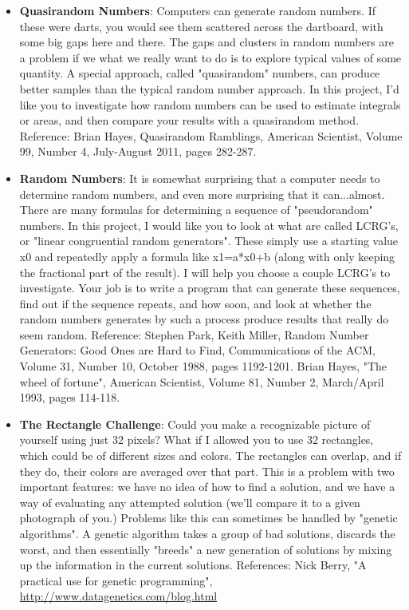 \documentclass{article}
\begin{document}
\begin{itemize}
\item \textbf{Quasirandom Numbers}: Computers can generate random numbers. If these were darts, you would see them scattered across the dartboard, with some big gaps here and there. The gaps and clusters in random numbers are a problem if we what we really want to do is to explore typical values of some quantity. A special approach, called "quasirandom" numbers, can produce better samples than the typical random number approach. In this project, I'd like you to investigate how random numbers can be used to estimate integrals or areas, and then compare your results with a quasirandom method. Reference: Brian Hayes, Quasirandom Ramblings, American Scientist, Volume 99, Number 4, July-August 2011, pages 282-287.

\item \textbf{Random Numbers}: It is somewhat surprising that a computer needs to determine random numbers, and even more surprising that it can...almost. There are many formulas for determining a sequence of "pseudorandom" numbers. In this project, I would like you to look at what are called LCRG's, or "linear congruential random generators". These simply use a starting value x0 and repeatedly apply a formula like x1=a*x0+b (along with only keeping the fractional part of the result). I will help you choose a couple LCRG's to investigate. Your job is to write a program that can generate these sequences, find out if the sequence repeats, and how soon, and look at whether the random numbers generates by such a process produce results that really do seem random. Reference: Stephen Park, Keith Miller, Random Number Generators: Good Ones are Hard to Find, Communications of the ACM, Volume 31, Number 10, October 1988, pages 1192-1201. Brian Hayes, "The wheel of fortune", American Scientist, Volume 81, Number 2, March/April 1993, pages 114-118.

\item \textbf{The Rectangle Challenge}: Could you make a recognizable picture of yourself using just 32 pixels? What if I allowed you to use 32 rectangles, which could be of different sizes and colors. The rectangles can overlap, and if they do, their colors are averaged over that part. This is a problem with two important features: we have no idea of how to find a solution, and we have a way of evaluating any attempted solution (we'll compare it to a given photograph of you.) Problems like this can sometimes be handled by "genetic algorithms". A genetic algorithm takes a group of bad solutions, discards the worst, and then essentially "breeds" a new generation of solutions by mixing up the information in the current solutions. References: Nick Berry, "A practical use for genetic programming", \url{http://www.datagenetics.com/blog.html}


\end{itemize}
\end{document}
